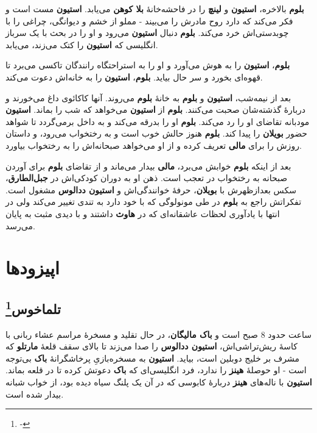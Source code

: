 \documentclass[12pt]{book}
\newcommand{\noun}[1]{{\textbf{#1}}}
\begin{document}
    \noun{بلوم} بالاخره، \noun{استیون} و \noun{لینچ} را در فاحشه‌خانهٔ \noun{بلا کوهن} می‌یابد. \noun{استیون} مست است و فکر می‌کند که دارد روح مادرش را می‌بیند - مملو از خشم و دیوانگی، چراغی را با چوبدستی‌اش خرد می‌کند. \noun{بلوم} دنبال \noun{استیون} می‌رود و او را در بحث با یک سرباز انگلیسی که \noun{استیون} را کتک می‌زند، می‌یابد.

    \noun{بلوم}، \noun{استیون} را به هوش می‌آورد و او را به استراحتگاه رانندگان تاکسی می‌برد تا قهوه‌ای بخورد و سر حال بیاید. \noun{بلوم}، \noun{استیون} را به خانه‌اش دعوت می‌کند.

    بعد از نیمه‌شب، \noun{استیون} و \noun{بلوم} به خانهٔ \noun{بلوم} می‌روند. آنها کاکائوی داغ می‌خورند و دربارهٔ گذشته‌شان صحبت می‌کنند. \noun{بلوم} از \noun{استیون} می‌خواهد که شب را بماند. \noun{استیون} مودبانه تقاضای او را رد می‌کند. \noun{بلوم} او را بدرقه می‌کند و به داخل برمی‌گردد تا شواهد حضور \noun{بویلان} را پیدا کند. \noun{بلوم} هنوز حالش خوب است و به رختخواب می‌رود، و داستان روزش را برای \noun{مالی} تعریف کرده و از او می‌خواهد صبحانه‌اش را به رختخواب بیاورد.

    بعد از اینکه \noun{بلوم} خوابش می‌برد، \noun{مالی} بیدار می‌ماند و از تقاضای \noun{بلوم} برای آوردن صبحانه به رختخواب در تعجب است. ذهن او به دوران کودکی‌اش در \noun{جبل‌الطارق}، سکس بعدازظهرش با \noun{بویلان}، حرفهٔ خوانندگی‌اش و \noun{استیون ددالوس} مشغول است. تفکراتش راجع به \noun{بلوم} در طی مونولوگی که با خود دارد به تندی تغییر می‌کند ولی در انتها با یادآوری لحظات عاشقانه‌ای که در \noun{هاوث} داشتند و با دیدی مثبت به پایان می‌رسد.
    
    \part{اپیزودها}
    \chapter[تلماخوس]{تلماخوس\protect\footnote{-}}\label{ep:1}
    ساعت حدود 8 صبح است و \noun{باک مالیگان‬}، در حال تقلید و مسخرهٔ مراسم عشاء ربانی با کاسهٔ ریش‌تراشی‌اش، \noun{استیون ددالوس} را صدا می‌زند تا بالای سقف قلعهٔ \noun{مارتلو} که مشرف بر خلیج دوبلین است، بیاید.  \noun{استیون} به مسخره‌بازیِ پرخاشگرانهٔ \noun{باک}  بی‌توجه است - او حوصلهٔ \noun{هینز}  را ندارد، فرد انگلیسی‌ای که \noun{باک}  دعوتش کرده تا در قلعه بماند. \noun{استیون} با ناله‌های \noun{هینز}  دربارهٔ کابوسی که در آن یک پلنگ سیاه دیده بود، از خواب شبانه بیدار شده است.
\end{document}
